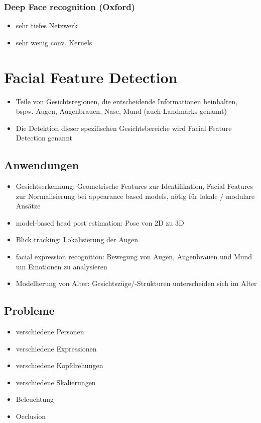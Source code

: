 \documentclass[paper=a4, fontsize=11pt]{scrartcl} %
\numberwithin{equation}{section} %
\numberwithin{figure}{section} %
\numberwithin{table}{section} %
\begin{document}
\subsubsection{Deep Face recognition (Oxford)}

\begin{itemize}
\item sehr tiefes Netzwerk
\item sehr wenig conv. Kernels
\end{itemize}

\section{Facial Feature Detection}

\begin{itemize}
\item Teile von Gesichtsregionen, die entscheidende Informationen beinhalten, bspw. Augen, Augenbrauen, Nase, Mund (auch Landmarks genannt)
\item Die Detektion dieser spezifischen Gesichtsbereiche wird Facial Feature Detection genannt
\end{itemize}


\begin{minipage}{0.65\textwidth}
\subsection{Anwendungen}

\begin{itemize}
\item Gesichtserkennung: Geometrische Features zur Identifikation, Facial Features zur Normalisierung bei appearance based models, nötig für lokale / modulare Ansätze
\item model-based head post estimation: Pose von 2D zu 3D
\item Blick tracking: Lokalisierung der Augen
\item facial expression recognition: Bewegung von Augen, Augenbrauen und Mund um Emotionen zu analysieren
\item Modellierung von Alter: Gesichtszüge/-Strukturen unterscheiden sich im Alter
\end{itemize}
\end{minipage} \hfill
\begin{minipage}{0.35\textwidth}

\subsection{Probleme}

\begin{itemize}
\item verschiedene Personen
\item verschiedene Expressionen
\item verschiedene Kopfdrehungen
\item verschiedene Skalierungen
\item Beleuchtung
\item Occlusion
\end{itemize}
\end{minipage}
\end{document}
